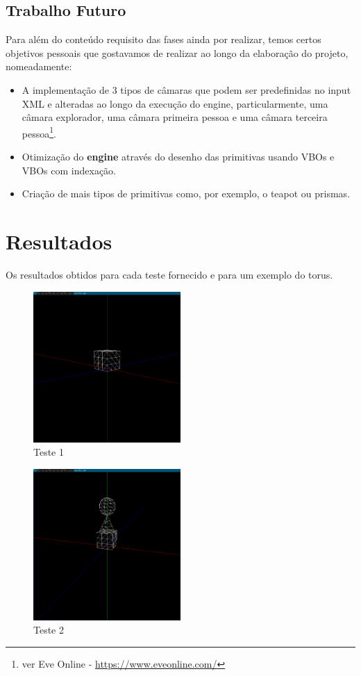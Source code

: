 \documentclass[14pt, a4paper]{article}
\begin{document}
\subsection{Trabalho Futuro}
Para além do conteúdo requisito das fases ainda por realizar, temos certos objetivos pessoais que
gostavamos de realizar ao longo da elaboração do projeto, nomeadamente:
\begin{itemize}
    \item A implementação de $3$ tipos de câmaras que podem ser predefinidas no input XML e alteradas ao
    longo da execução do engine, particularmente, uma câmara explorador, uma câmara primeira pessoa e
    uma câmara terceira pessoa\footnote{ver Eve Online - \url{https://www.eveonline.com/}}.
    \item Otimização do \textbf{engine} atrav\'es do desenho das primitivas usando VBOs e VBOs com indexação.
    \item Criação de mais tipos de primitivas como, por exemplo, o teapot ou prismas.
\end{itemize}


\newpage
\section{Resultados} \label{sec:resultado}

Os resultados obtidos para cada teste fornecido e para um exemplo do torus.

\begin{figure}[ht]
\centering
\includegraphics[width=0.5\textwidth]{images/1.png}
\caption{Teste 1}
\end{figure}

\begin{figure}[ht]
\centering
\includegraphics[width=0.5\textwidth]{images/2.png}
\caption{Teste 2}
\end{figure}
\end{document}
